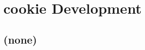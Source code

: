 
\cleardoublepage


\chapter{cookie Development}\label{ch:model-code}

\hfill \break

\newpage

\section{(none)}

